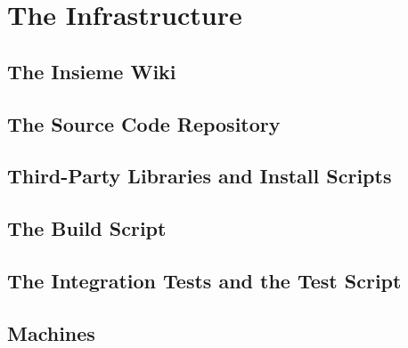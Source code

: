 \chapter{The Infrastructure} \label{cap:infrastructure}

\section{The Insieme Wiki}
\section{The Source Code Repository}
\section{Third-Party Libraries and Install Scripts}
\section{The Build Script} \label{sec:Infrastructure.Build}
\section{The Integration Tests and the Test Script}
\section{Machines}
